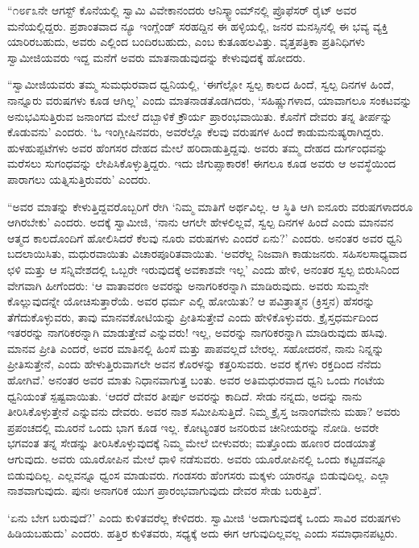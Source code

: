  “೧೮೯೩ನೇ ಆಗಸ್ಟ್ ಕೊನೆಯಲ್ಲಿ ಸ್ವಾಮಿ ವಿವೇಕಾನಂದರು ಆನಿಸ್ಕ್ವಾಂಮ್‍ನಲ್ಲಿ ಪ್ರೊಫೆಸರ್ ರೈಟ್ ಅವರ ಮನೆಯಲ್ಲಿದ್ದರು. ಪ್ರಶಾಂತವಾದ ನ್ಯೂ ಇಂಗ್ಲೆಂಡ್ ಸರಹದ್ದಿನ ಈ ಹಳ್ಳಿಯಲ್ಲಿ, ಜನರ ಮನಸ್ಸಿನಲ್ಲಿ ಈ ಭವ್ಯ ವ್ಯಕ್ತಿ ಯಾರಿರಬಹುದು, ಅವರು ಎಲ್ಲಿಂದ ಬಂದಿರಬಹುದು, ಎಂಬ ಕುತೂಹಲವಿತ್ತು. ವೃತ್ತಪತ್ರಿಕಾ ಪ್ರತಿನಿಧಿಗಳು ಸ್ವಾಮೀಜಿಯವರು ಇದ್ದ ಮನೆಗೆ ಅವರು ಮಾತನಾಡುವುದನ್ನು ಕೇಳುವುದಕ್ಕೆ ಹೋದರು.

 “ಸ್ವಾಮೀಜಿಯವರು ತಮ್ಮ ಸುಮಧುರವಾದ ಧ್ವನಿಯಲ್ಲಿ, ‘ಈಗೆಲ್ಲೋ ಸ್ವಲ್ಪ ಕಾಲದ ಹಿಂದೆ, ಸ್ವಲ್ಪ ದಿನಗಳ ಹಿಂದೆ, ನಾನ್ನೂರು ವರುಷಗಳು ಕೂಡ ಆಗಿಲ್ಲ’ ಎಂದು ಮಾತನಾಡತೊಡಗಿದರು, ‘ಸಹಿಷ್ಣುಗಳಾದ, ಯಾವಾಗಲೂ ಸಂಕಟವನ್ನು ಅನುಭವಿಸುತ್ತಿರುವ ಜನಾಂಗದ ಮೇಲೆ ದಬ್ಬಾಳಿಕೆ ಕ್ರೌರ್ಯ ಪ್ರಾರಂಭವಾಯಿತು. ಕೊನೆಗೆ ದೇವರು ತನ್ನ ತೀರ್ಪನ್ನು ಕೊಡುವನು’ ಎಂದರು. ‘ಓ ಇಂಗ್ಲೀಷಿನವರು, ಅವರೆಲ್ಲೊ ಕೆಲವು ವರುಷಗಳ ಹಿಂದೆ ಕಾಡುಮನುಷ್ಯರಾಗಿದ್ದರು. ಹುಳಹುಪ್ಪಟೆಗಳು ಅವರ ಹೆಂಗಸರ ದೇಹದ ಮೇಲೆ ಹರಿದಾಡುತ್ತಿದ್ದವು. ಅವರು ತಮ್ಮ ದೇಹದ ದುರ್ಗಂಧವನ್ನು ಮರೆಸಲು ಸುಗಂಧವನ್ನು ಲೇಪಿಸಿಕೊಳ್ಳುತ್ತಿದ್ದರು. ಇದು ಜಿಗುಪ್ಸಾಕಾರಕ! ಈಗಲೂ ಕೂಡ ಅವರು ಆ ಅವಸ್ಥೆಯಿಂದ ಪಾರಾಗಲು ಯತ್ನಿಸುತ್ತಿರುವರು’ ಎಂದರು.

 “ಅವರ ಮಾತನ್ನು ಕೇಳುತ್ತಿದ್ದವರೊಬ್ಬರಿಗೆ ರೇಗಿ ‘ನಿಮ್ಮ ಮಾತಿಗೆ ಅರ್ಥವಿಲ್ಲ. ಆ ಸ್ಥಿತಿ ಆಗಿ ಐನೂರು ವರುಷಗಳಾದರೂ ಆಗಿರಬೇಕು’ ಎಂದರು. ಅದಕ್ಕೆ ಸ್ವಾಮೀಜಿ, ‘ನಾನು ಆಗಲೇ ಹೇಳಲಿಲ್ಲವೆ, ಸ್ವಲ್ಪ ದಿನಗಳ ಹಿಂದೆ ಎಂದು ಮಾನವನ ಆತ್ಮದ ಕಾಲದೊಂದಿಗೆ ಹೋಲಿಸಿದರೆ ಕೆಲವು ನೂರು ವರುಷಗಳು ಎಂದರೆ ಏನು?’ ಎಂದರು. ಅನಂತರ ಅವರ ಧ್ವನಿ ಬದಲಾಯಿಸಿತು, ಮಧುರವಾಯಿತು ವಿಚಾರಪೂರಿತವಾಯಿತು. ‘ಅವರೆಲ್ಲ ನಿಜವಾಗಿ ಕಾಡುಜನರು. ಸಹಿಸಲಸಾಧ್ಯವಾದ ಛಳಿ ಮತ್ತು ಆ ಸನ್ನಿವೇಶದಲ್ಲಿ ಒಬ್ಬರೇ ಇರುವುದಕ್ಕೆ ಅವಕಾಶವೇ ಇಲ್ಲ’ ಎಂದು ಹೇಳಿ, ಅನಂತರ ಸ್ವಲ್ಪ ಬಿರುಸಿನಿಂದ ವೇಗವಾಗಿ ಹೀಗೆಂದರು: ‘ಆ ವಾತಾವರಣ ಅವರನ್ನು ಅನಾಗರಿಕರನ್ನಾಗಿ ಮಾಡಿರುವುದು. ಅವರು ಸುಮ್ಮನೇ ಕೊಲ್ಲುವುದನ್ನೇ ಯೋಚಿಸುತ್ತಾರೆಯೆ. ಅವರ ಧರ್ಮ ಎಲ್ಲಿ ಹೋಯಿತು? ಆ ಪವಿತ್ರಾತ್ಮನ (ಕ್ರಿಸ್ತನ) ಹೆಸರನ್ನು ತೆಗೆದುಕೊಳ್ಳುವರು, ತಾವು ಮಾನವಕೋಟಿಯನ್ನು ಪ್ರೀತಿಸುತ್ತೇವೆ ಎಂದು ಹೇಳಿಕೊಳ್ಳುವರು. ಕ್ರೈಸ್ತಧರ್ಮದಿಂದ ಇತರರನ್ನು ನಾಗರಿಕರನ್ನಾಗಿ ಮಾಡುತ್ತೇವೆ ಎನ್ನುವರು! ಇಲ್ಲ, ಅವರನ್ನು ನಾಗರಿಕರನ್ನಾಗಿ ಮಾಡಿರುವುದು ಹಸಿವು. ಮಾನವ ಪ್ರೀತಿ ಎಂದರೆ, ಅವರ ಮಾತಿನಲ್ಲಿ ಹಿಂಸೆ ಮತ್ತು ಪಾಪವಲ್ಲದೆ ಬೇರಲ್ಲ. ಸಹೋದರನೆ, ನಾನು ನಿನ್ನನ್ನು ಪ್ರೀತಿಸುತ್ತೇನೆ, ಎಂದು ಹೇಳುತ್ತಿರುವಾಗಲೇ ಅವನ ಕೊರಳನ್ನು ಕತ್ತರಿಸುವರು. ಅವರ ಕೈಗಳು ರಕ್ತದಿಂದ ನೆನೆದು ಹೋಗಿವೆ.’ ಅನಂತರ ಅವರ ಮಾತು ನಿಧಾನವಾಗುತ್ತ ಬಂತು. ಅವರ ಅತಿಮಧುರವಾದ ಧ್ವನಿ ಒಂದು ಗಂಟೆಯ ಧ್ವನಿಯಂತೆ ಸ್ಪಷ್ಟವಾಯಿತು. ‘ಆದರೆ ದೇವರ ತೀರ್ಪು ಅವರನ್ನು ಕಾದಿದೆ. ಸೇಡು ನನ್ನದು, ಅದನ್ನು ನಾನು ತೀರಿಸಿಕೊಳ್ಳುತ್ತೇನೆ ಎನ್ನುವನು ದೇವರು. ಅವರ ನಾಶ ಸಮೀಪಿಸುತ್ತಿದೆ. ನಿಮ್ಮ ಕ್ರೈಸ್ತ ಜನಾಂಗವೇನು ಮಹಾ? ಅವರು ಪ್ರಪಂಚದಲ್ಲಿ ಮೂರನೆ ಒಂದು ಭಾಗ ಕೂಡ ಇಲ್ಲ. ಕೋಟ್ಯಂತರ ಜನರಿರುವ ಚೀನೀಯರನ್ನು ನೋಡಿ. ಅವರೇ ಭಗವಂತ ತನ್ನ ಸೇಡನ್ನು ತೀರಿಸಿಕೊಳ್ಳುವುದಕ್ಕೆ ನಿಮ್ಮ ಮೇಲೆ ಬೀಳುವರು; ಮತ್ತೊಂದು ಹೂಣರ ದಂಡಯಾತ್ರೆ ಆಗುವುದು. ಅವರು ಯೂರೋಪಿನ ಮೇಲೆ ಧಾಳಿ ನಡೆಸುವರು. ಅವರು ಯೂರೋಪಿನಲ್ಲಿ ಒಂದು ಕಟ್ಟಡವನ್ನೂ ಬಿಡುವುದಿಲ್ಲ. ಎಲ್ಲವನ್ನೂ ಧ್ವಂಸ ಮಾಡುವರು. ಗಂಡಸರು ಹೆಂಗಸರು ಮಕ್ಕಳು ಯಾರನ್ನೂ ಬಿಡುವುದಿಲ್ಲ. ಎಲ್ಲಾ ನಾಶವಾಗುವುದು. ಪುನಃ ಅನಾಗರಿಕ ಯುಗ ಪ್ರಾರಂಭವಾಗುವುದು ದೇವರ ಸೇಡು ಬರುತ್ತಿದೆ’.

 ‘ಏನು ಬೇಗ ಬರುವುದೆ?’ ಎಂದು ಕುಳಿತವರೆಲ್ಲ ಕೇಳಿದರು. ಸ್ವಾಮೀಜಿ ‘ಅದಾಗುವುದಕ್ಕೆ ಒಂದು ಸಾವಿರ ವರುಷಗಳು ಹಿಡಿಯಬಹುದು’ ಎಂದರು. ಹತ್ತಿರ ಕುಳಿತವರು, ಸಧ್ಯಕ್ಕೆ ಅದು ಈಗ ಆಗುವುದಿಲ್ಲವಲ್ಲ ಎಂದು ಸಮಾಧಾನಪಟ್ಟರು.

